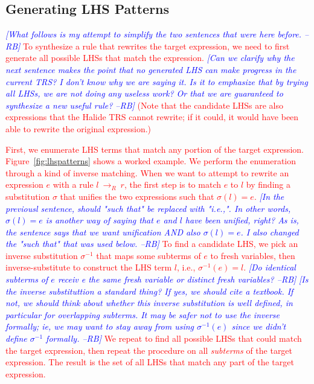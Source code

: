\documentclass[acmsmall,review]{acmart}\settopmatter{printfolios=true,printccs=false,printacmref=false}
\newcommand{\rb}[1]{\textcolor{blue}{\textit{[{#1} --RB]}}}
\newcommand{\modified}[1]{\textcolor{red}{{#1}}}
\newcommand{\rewrites}[0]{\:\rightarrow_{R}\:}
\begin{document}
\subsection{Generating LHS Patterns}
\modified{
\rb{What follows is my attempt to simplify the two sentences that were here before.}
To synthesize a rule that rewrites the target expression, we need to first generate all possible LHSs that match the expression.  
\rb{Can we clarify why the next sentence makes the point that no generated LHS can make progress in the current TRS? I don't know why we are saying it. Is it to emphasize that by trying all LHSs, we are not doing any useless work? Or that we are guaranteed to synthesize a new useful rule? }
(Note that the candidate LHSs are also expressions that the Halide TRS cannot rewrite; 
if it could, it would have been able to rewrite the original expression.)}

\modified{
First, we enumerate LHS terms that match any portion of the target expression.  Figure~\ref{fig:lhspatterns} shows a worked example. 
We perform the enumeration through a kind of inverse matching. When we want 
to attempt to rewrite an expression $e$ with a rule $l \rewrites r$, the first step is to 
match $e$ to $l$ by finding a substitution $\sigma$ that unifies the two expressions 
such that $\sigma(l) = e$. 
\rb{In the previousl sentence, should "such that" be replaced with "i.e.,".  In other words, $\sigma(l) = e$ is another way of saying that $e$ and $l$ have been unified, right?  As is, the sentence says that we want unification AND also $\sigma(l) = e$. I also changed the "such that" that was used below. }
To find a candidate LHS, we pick an inverse substitution $\sigma^{-1}$
that maps some subterms of $e$ to fresh variables, then inverse-substitute to construct the LHS term $l$, i.e., $\sigma^{-1}(e) = l$. 
\rb{Do identical subterms of $e$ receiv e the same fresh variable or distinct fresh variables? }
\rb{Is the inverse substituttion a standard thing? If yes, we should cite a textbook.  If not, we should think about whether this inverse substitution is well defined, in particular for overlapping subterms. It may be safer not to use the inverse formally; ie, we may want to stay away from using $\sigma^{-1}(e)$ since we didn't define $\sigma^{-1}$ formally. }
We repeat to find all possible LHSs that could match the
target expression, then repeat the procedure on all \emph{subterms} of the target expression.  The result is the set of all 
LHSs that match any part of the target expression. }
\end{document}
